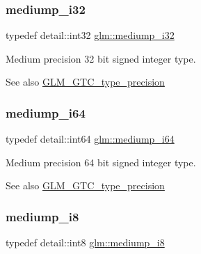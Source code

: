 \subsubsection{\texorpdfstring{mediump\+\_\+i32}{mediump\_i32}}
{\footnotesize\ttfamily typedef detail\+::int32 \hyperlink{group__gtc__type__precision_ga5e00ec824eb55968a6b6496f294d8c07}{glm\+::mediump\+\_\+i32}}

Medium precision 32 bit signed integer type. \begin{DoxySeeAlso}{See also}
\hyperlink{group__gtc__type__precision}{G\+L\+M\+\_\+\+G\+T\+C\+\_\+type\+\_\+precision} 
\end{DoxySeeAlso}
\mbox{\label{group__gtc__type__precision_ga90fedf6c701ffbe00535156715e50787}} 
\subsubsection{\texorpdfstring{mediump\+\_\+i64}{mediump\_i64}}
{\footnotesize\ttfamily typedef detail\+::int64 \hyperlink{group__gtc__type__precision_ga90fedf6c701ffbe00535156715e50787}{glm\+::mediump\+\_\+i64}}

Medium precision 64 bit signed integer type. \begin{DoxySeeAlso}{See also}
\hyperlink{group__gtc__type__precision}{G\+L\+M\+\_\+\+G\+T\+C\+\_\+type\+\_\+precision} 
\end{DoxySeeAlso}
\mbox{\label{group__gtc__type__precision_ga28a8b5fd51072680bb55178c17cc7411}} 
\subsubsection{\texorpdfstring{mediump\+\_\+i8}{mediump\_i8}}
{\footnotesize\ttfamily typedef detail\+::int8 \hyperlink{group__gtc__type__precision_ga28a8b5fd51072680bb55178c17cc7411}{glm\+::mediump\+\_\+i8}}

